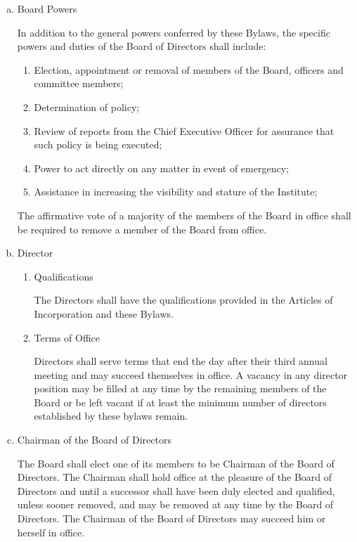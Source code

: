 \begin{enumerate}[(a)]
\item Board Powers

In addition to the general powers conferred by these Bylaws, the specific powers and duties of the Board of Directors shall include:

\begin{enumerate}
\item Election, appointment or removal of members of the Board, officers and committee members; 
\item Determination of policy;
\item Review of reports from the Chief Executive Officer for assurance that such policy is being executed;
\item Power to act directly on any matter in event of emergency;
\item Assistance in increasing the visibility and stature of the Institute;
\end{enumerate}

The affirmative vote of a majority of the members of the Board in office shall be required to remove a member of the Board from office.

\item Director

\begin{enumerate}
\item Qualifications

The Directors shall have the qualifications provided in the Articles of Incorporation and these Bylaws. 

\item Terms of Office

Directors shall serve terms that end the day after their third annual meeting and may succeed themselves in office.  A vacancy in any director position may be filled at any time by the remaining members of the Board or be left vacant if at least the minimum number of directors established by these bylaws remain.

\end{enumerate}

\item Chairman of the Board of Directors

The Board shall elect one of its members to be Chairman of the Board of Directors. The Chairman shall hold office at the pleasure of the Board of Directors and until a successor shall have been duly elected and qualified, unless sooner removed, and may be removed at any time by the Board of Directors. The Chairman of the Board of Directors may succeed him or herself in office.

\end{enumerate}


